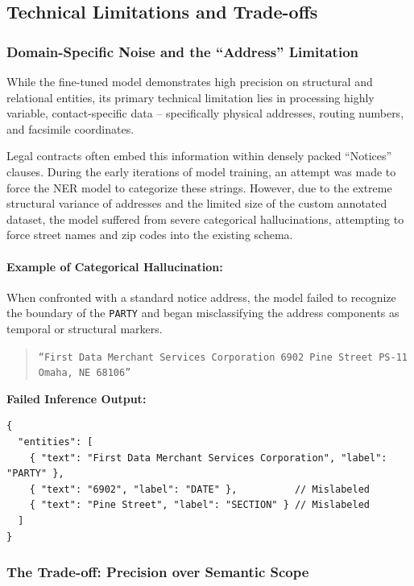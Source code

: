\documentclass[twoside,final]{hcmut-report}
\begin{document}
\subsection{Technical Limitations and Trade-offs}
\subsubsection{Domain-Specific Noise and the ``Address'' Limitation}

While the fine-tuned model demonstrates high precision on structural and relational entities, its primary technical limitation lies in processing highly variable, contact-specific data -- specifically physical addresses, routing numbers, and facsimile coordinates.

\medskip

Legal contracts often embed this information within densely packed ``Notices'' clauses. During the early iterations of model training, an attempt was made to force the NER model to categorize these strings. However, due to the extreme structural variance of addresses and the limited size of the custom annotated dataset, the model suffered from severe categorical hallucinations, attempting to force street names and zip codes into the existing schema.

\paragraph{Example of Categorical Hallucination:}
When confronted with a standard notice address, the model failed to recognize the boundary of the \texttt{PARTY} and began misclassifying the address components as temporal or structural markers.

\begin{quote}
  \texttt{``First Data Merchant Services Corporation 6902 Pine Street PS-11 Omaha, NE 68106''}
\end{quote}

\noindent
\textbf{Failed Inference Output:}
\begin{verbatim}
{
  "entities": [
    { "text": "First Data Merchant Services Corporation", "label": "PARTY" },
    { "text": "6902", "label": "DATE" },          // Mislabeled
    { "text": "Pine Street", "label": "SECTION" } // Mislabeled
  ]
}
\end{verbatim}

\subsubsection{The Trade-off: Precision over Semantic Scope}
\end{document}
